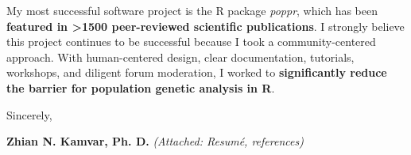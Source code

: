 \vspace{1ex}

My most successful software project is the R package
\textit{poppr}, which has been \textbf{featured in \textgreater1500
peer-reviewed scientific publications}. I strongly believe this project 
continues to be successful because I took a community-centered approach. With
human-centered design, clear documentation, tutorials, workshops, and diligent
forum moderation, I worked to \textbf{significantly reduce the barrier
for population genetic analysis in R}.


\vspace{1ex}

%

\vspace{1ex}

%
%
\vspace{1ex}



\vspace{2ex}

Sincerely,

\vspace{3ex}

\textbf{Zhian N. Kamvar, Ph. D.}
{\footnotesize \textit{(Attached: Resum\'{e}, references)}}

\clearpage



